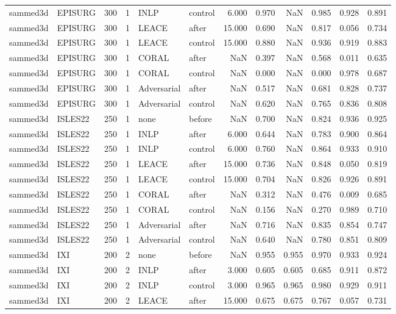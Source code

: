 \begin{tabular}{llrrllrrrrrr}
sammed3d & EPISURG & 300 & 1 & INLP & control & 6.000 & 0.970 & NaN & 0.985 & 0.928 & 0.891 \\
sammed3d & EPISURG & 300 & 1 & LEACE & after & 15.000 & 0.690 & NaN & 0.817 & 0.056 & 0.734 \\
sammed3d & EPISURG & 300 & 1 & LEACE & control & 15.000 & 0.880 & NaN & 0.936 & 0.919 & 0.883 \\
sammed3d & EPISURG & 300 & 1 & CORAL & after & NaN & 0.397 & NaN & 0.568 & 0.011 & 0.635 \\
sammed3d & EPISURG & 300 & 1 & CORAL & control & NaN & 0.000 & NaN & 0.000 & 0.978 & 0.687 \\
sammed3d & EPISURG & 300 & 1 & Adversarial & after & NaN & 0.517 & NaN & 0.681 & 0.828 & 0.737 \\
sammed3d & EPISURG & 300 & 1 & Adversarial & control & NaN & 0.620 & NaN & 0.765 & 0.836 & 0.808 \\
sammed3d & ISLES22 & 250 & 1 & none & before & NaN & 0.700 & NaN & 0.824 & 0.936 & 0.925 \\
sammed3d & ISLES22 & 250 & 1 & INLP & after & 6.000 & 0.644 & NaN & 0.783 & 0.900 & 0.864 \\
sammed3d & ISLES22 & 250 & 1 & INLP & control & 6.000 & 0.760 & NaN & 0.864 & 0.933 & 0.910 \\
sammed3d & ISLES22 & 250 & 1 & LEACE & after & 15.000 & 0.736 & NaN & 0.848 & 0.050 & 0.819 \\
sammed3d & ISLES22 & 250 & 1 & LEACE & control & 15.000 & 0.704 & NaN & 0.826 & 0.926 & 0.891 \\
sammed3d & ISLES22 & 250 & 1 & CORAL & after & NaN & 0.312 & NaN & 0.476 & 0.009 & 0.685 \\
sammed3d & ISLES22 & 250 & 1 & CORAL & control & NaN & 0.156 & NaN & 0.270 & 0.989 & 0.710 \\
sammed3d & ISLES22 & 250 & 1 & Adversarial & after & NaN & 0.716 & NaN & 0.835 & 0.854 & 0.747 \\
sammed3d & ISLES22 & 250 & 1 & Adversarial & control & NaN & 0.640 & NaN & 0.780 & 0.851 & 0.809 \\
sammed3d & IXI & 200 & 2 & none & before & NaN & 0.955 & 0.955 & 0.970 & 0.933 & 0.924 \\
sammed3d & IXI & 200 & 2 & INLP & after & 3.000 & 0.605 & 0.605 & 0.685 & 0.911 & 0.872 \\
sammed3d & IXI & 200 & 2 & INLP & control & 3.000 & 0.965 & 0.965 & 0.980 & 0.929 & 0.911 \\
sammed3d & IXI & 200 & 2 & LEACE & after & 15.000 & 0.675 & 0.675 & 0.767 & 0.057 & 0.731 \\

\end{tabular}
